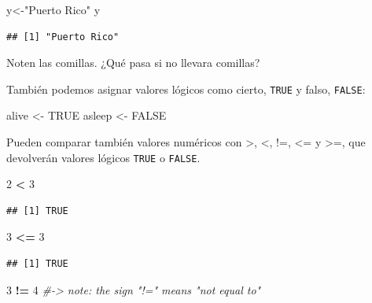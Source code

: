 \documentclass[
]{article}
\newenvironment{Shaded}{\begin{snugshade}}{\end{snugshade}}
\newcommand{\CommentTok}[1]{\textcolor[rgb]{0.56,0.35,0.01}{\textit{#1}}}
\newcommand{\ConstantTok}[1]{\textcolor[rgb]{0.56,0.35,0.01}{#1}}
\newcommand{\DecValTok}[1]{\textcolor[rgb]{0.00,0.00,0.81}{#1}}
\newcommand{\NormalTok}[1]{#1}
\newcommand{\OtherTok}[1]{\textcolor[rgb]{0.56,0.35,0.01}{#1}}
\newcommand{\SpecialCharTok}[1]{\textcolor[rgb]{0.81,0.36,0.00}{\textbf{#1}}}
\newcommand{\StringTok}[1]{\textcolor[rgb]{0.31,0.60,0.02}{#1}}
\begin{document}
\begin{Shaded}
\begin{Highlighting}[]
\NormalTok{y}\OtherTok{\textless{}{-}}\StringTok{"Puerto Rico"}
\NormalTok{y}
\end{Highlighting}
\end{Shaded}

\begin{verbatim}
## [1] "Puerto Rico"
\end{verbatim}

Noten las comillas. ¿Qué pasa si no llevara comillas?

También podemos asignar valores lógicos como cierto, \texttt{TRUE} y
falso, \texttt{FALSE}:

\begin{Shaded}
\begin{Highlighting}[]
\NormalTok{alive }\OtherTok{\textless{}{-}} \ConstantTok{TRUE}
\NormalTok{asleep }\OtherTok{\textless{}{-}} \ConstantTok{FALSE}
\end{Highlighting}
\end{Shaded}

Pueden comparar también valores numéricos con \textgreater, \textless,
!=, \textless= y \textgreater=, que devolverán valores lógicos
\texttt{TRUE} o \texttt{FALSE}.

\begin{Shaded}
\begin{Highlighting}[]
\DecValTok{2} \SpecialCharTok{\textless{}} \DecValTok{3}
\end{Highlighting}
\end{Shaded}

\begin{verbatim}
## [1] TRUE
\end{verbatim}

\begin{Shaded}
\begin{Highlighting}[]
\DecValTok{3} \SpecialCharTok{\textless{}=} \DecValTok{3}
\end{Highlighting}
\end{Shaded}

\begin{verbatim}
## [1] TRUE
\end{verbatim}

\begin{Shaded}
\begin{Highlighting}[]
\DecValTok{3} \SpecialCharTok{!=} \DecValTok{4} \CommentTok{\#{-}\textgreater{} note: the sign "!=" means "not equal to"}
\end{Highlighting}
\end{Shaded}
\end{document}
